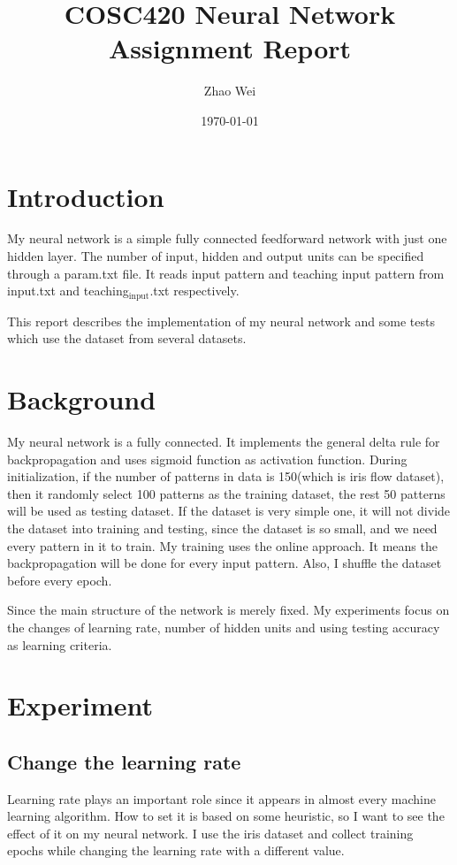\documentclass[11pt]{article}
\author{Zhao Wei}
\date{\today}
\title{COSC420 Neural Network Assignment Report}
\begin{document}
\maketitle
\tableofcontents


\section{Introduction}
\label{sec-1}
My neural network is a simple fully connected feedforward network with just one hidden layer. The number of input, hidden and output units can be specified through a param.txt file. It reads input pattern and teaching input pattern from input.txt and teaching$_{\text{input}}$.txt respectively. 

This report describes the implementation of my neural network and some tests which use the dataset from several datasets. 
\section{Background}
\label{sec-2}
My neural network is a fully connected. It implements the general delta rule for backpropagation and uses sigmoid function as activation function. During initialization, if the number of patterns in data is 150(which is iris flow dataset), then it randomly select 100 patterns as the training dataset, the rest 50 patterns will be used as testing dataset. If the dataset is very simple one, it will not divide the dataset into training and testing, since the dataset is so small, and we need every pattern in it to train. My training uses the online approach. It means the backpropagation will be done for every input pattern. Also, I shuffle the dataset before every epoch.

Since the main structure of the network is merely fixed. My experiments focus on the changes of learning rate, number of hidden units and using testing accuracy as learning criteria.

\section{Experiment}
\label{sec-3}
\subsection{Change the learning rate}
\label{sec-3-1}
Learning rate plays an important role since it appears in almost every machine learning algorithm. How to set it is based on some heuristic, so I want to see the effect of it on my neural network. I use the iris dataset and collect training epochs while changing the learning rate with a different value.
\end{document}
